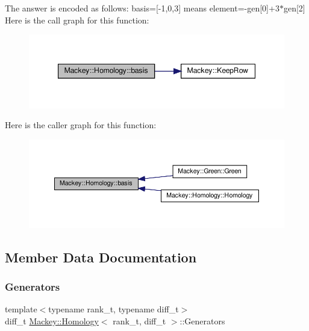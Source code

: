 The answer is encoded as follows\+: basis=\mbox{[}-\/1,0,3\mbox{]} means element=-\/gen\mbox{[}0\mbox{]}+3$\ast$gen\mbox{[}2\mbox{]} Here is the call graph for this function\+:\nopagebreak
\begin{figure}[H]
\begin{center}
\leavevmode
\includegraphics[width=347pt]{classMackey_1_1Homology_a3ef6bc9a9859c3711c11d153ba55b3e1_cgraph}
\end{center}
\end{figure}
Here is the caller graph for this function\+:\nopagebreak
\begin{figure}[H]
\begin{center}
\leavevmode
\includegraphics[width=350pt]{classMackey_1_1Homology_a3ef6bc9a9859c3711c11d153ba55b3e1_icgraph}
\end{center}
\end{figure}


\subsection{Member Data Documentation}
\mbox{\label{classMackey_1_1Homology_afc375f3632f97e3fe3e24c06f1e18fa2}} 
\subsubsection{\texorpdfstring{Generators}{Generators}}
{\footnotesize\ttfamily template$<$typename rank\+\_\+t, typename diff\+\_\+t$>$ \\
diff\+\_\+t \hyperlink{classMackey_1_1Homology}{Mackey\+::\+Homology}$<$ rank\+\_\+t, diff\+\_\+t $>$\+::Generators}




